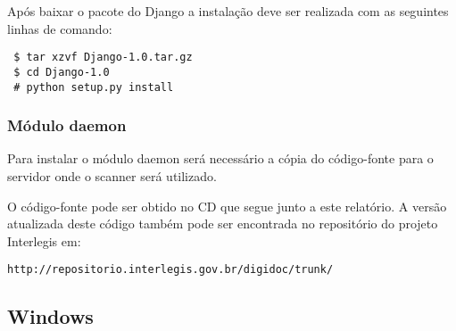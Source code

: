 Após baixar o pacote do Django a instalação deve ser realizada com as 
seguintes linhas de comando:
\begin{verbatim}
 $ tar xzvf Django-1.0.tar.gz
 $ cd Django-1.0
 # python setup.py install
\end{verbatim}

\subsubsection{Módulo daemon}
Para instalar o módulo daemon será necessário a cópia do 
código-fonte para o servidor onde o scanner será utilizado.

O código-fonte pode ser obtido no CD que segue junto a este
relatório. A versão atualizada deste código também pode ser encontrada
no repositório do projeto Interlegis em:
\begin{verbatim}
http://repositorio.interlegis.gov.br/digidoc/trunk/
\end{verbatim}
 

\subsection{Windows}
